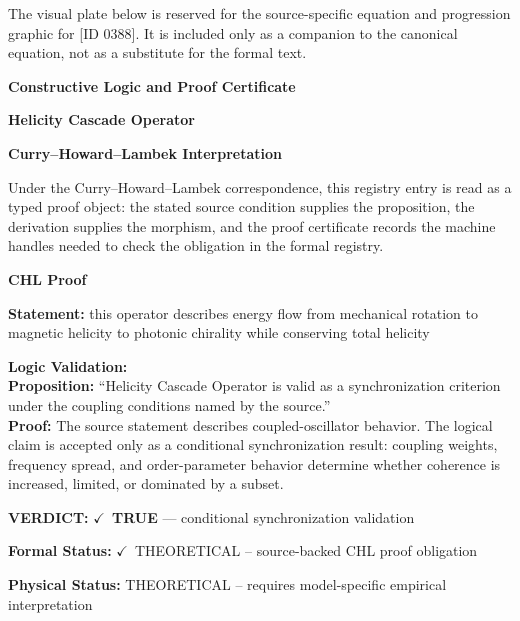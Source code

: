 \begingroup\footnotesize\sloppy
The visual plate below is reserved for the source-specific equation and progression graphic for [ID 0388]. It is included only as a companion to the canonical equation, not as a substitute for the formal text.
\par\endgroup
\ifTZPDarkEdition
{}
\fi

\clearpage
\begingroup\tzpsupportsetup
\noindent\textbf{\fontsize{10.8pt}{12.8pt}\selectfont [ID 0388] Constructive Logic and Proof Certificate}\par
\noindent\textbf{\fontsize{10pt}{12pt}\selectfont Helicity Cascade Operator}\par
\vspace{0.45em}
\begingroup
\footnotesize
\setlength{\parskip}{0.22em}
\setlength{\parindent}{0pt}
\noindent\textbf{Curry--Howard--Lambek Interpretation}\par
Under the Curry--Howard--Lambek correspondence, this registry entry is read as a typed proof
object: the stated source condition supplies the proposition, the derivation supplies the
morphism, and the proof certificate records the machine handles needed to check the obligation
in the formal registry.

\vspace{0.45em}
\noindent\textbf{CHL Proof}\par
\textbf{Statement:} this operator describes energy flow from mechanical rotation to magnetic helicity to
photonic chirality while conserving total helicity

\textbf{Logic Validation:}\\
\textbf{Proposition:} ``Helicity Cascade Operator is valid as a synchronization criterion under the coupling
conditions named by the source.''\\
\textbf{Proof:} The source statement describes coupled-oscillator behavior. The logical claim is
accepted only as a conditional synchronization result: coupling weights, frequency
spread, and order-parameter behavior determine whether coherence is increased, limited,
or dominated by a subset.

\textbf{VERDICT:} \ensuremath{\checkmark}\ \textbf{TRUE} --- conditional synchronization validation

\textbf{Formal Status:} \ensuremath{\checkmark}\ THEORETICAL -- source-backed CHL proof obligation

\textbf{Physical Status:} THEORETICAL -- requires model-specific empirical interpretation
\par\vspace{0.45em}
\par
\ifTZPDarkEdition
{}
\fi
\endgroup
\endgroup
